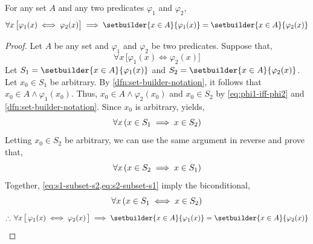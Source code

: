 \begin{thm}
    \label{thm:equal-predicate-specification}
    For any set \( A \) and any two predicates \( \varphi_{1} \) and \( \varphi_{2} \),
    \begin{equation*}
        \forall x \, \big[ \varphi_{1}(x) \iff \varphi_{2}(x) \big]
        \implies \setbuilder{x \in A}{\varphi_{1}(x)} = \setbuilder{x \in A}{\varphi_{2}(x)}
    \end{equation*}
\end{thm}

\begin{proof}
    Let \( A \) be any set and \( \varphi_{1} \) and \( \varphi_{2} \) be two predicates. Suppose that,
    \begin{equation}
        \label{eq:phi1-iff-phi2}
        \forall x \, \big[ \varphi_{1}(x) \iff \varphi_{2}(x) \big]
    \end{equation}
    Let \( S_{1} = \setbuilder{x \in A}{\varphi_{1}(x)} \) and \( S_{2} = \setbuilder{x \in A}{\varphi_{2}(x)} \).
    Let \( x_{0} \in S_{1} \) be arbitrary. By \cref{dfn:set-builder-notation}, it follows that \( x_{0} \in A \land \varphi_{1}(x_{0}) \).
    Thus, \( x_{0} \in A \land \varphi_{2}(x_{0}) \) and \( x_{0} \in S_{2} \) by
    \eqref{eq:phi1-iff-phi2} and \cref{dfn:set-builder-notation}. Since \( x_{0} \) is arbitrary,  yields,
    \begin{equation}
        \label{eq:s1-subset-s2}
        \forall x \, \mleft( x \in S_{1} \implies x \in S_{2} \mright)
    \end{equation}
    Letting \( x_{0} \in S_{2} \) be arbitrary, we can use the same argument in reverse and prove that,
    \begin{equation}
        \label{eq:s2-subset-s1}
        \forall x \, \mleft( x \in S_{2} \implies x \in S_{1} \mright)
    \end{equation}
    Together, \cref{eq:s1-subset-s2,eq:s2-subset-s1} imply the biconditional,
    \begin{equation}
        \label{eq:s1-equals-s2}
        \forall x \, \mleft( x \in S_{1} \iff x \in S_{2} \mright)
    \end{equation}
    \begin{equation*}
        \therefore \, \forall x \, \big[\, \varphi_{1}(x) \iff \varphi_{2}(x) \,\big]
        \implies \setbuilder{x \in A}{\varphi_{1}(x)} = \setbuilder{x \in A}{\varphi_{2}(x)} \qedhere
    \end{equation*}
\end{proof}

